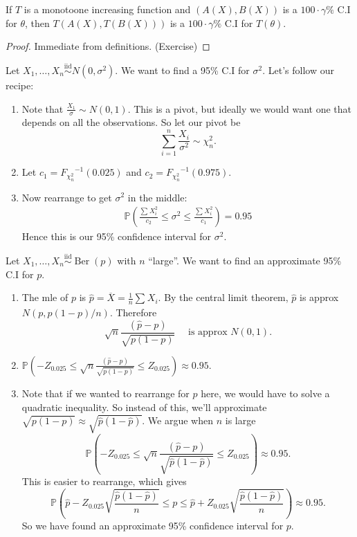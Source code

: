 \documentclass[a4paper]{scrartcl}
\begin{document}
\begin{proposition}
      If $T$ is a monotoone increasing function and $(A (X),B (X))$ is a $100 \cdot \gamma \%$ C.I for $\theta$, then $T (A (X),T (B (X)))$ is a $100 \cdot \gamma \%$ C.I for $T (\theta)$.
\end{proposition}
\begin{proof}
      Immediate from definitions. (Exercise)
\end{proof}
\begin{example*}
      Let $X_1 , \ldots, X_n \overset{\operatorname{iid}}{\sim} N (0,\sigma^{2} )$. We want to find a 95\% C.I for $\sigma^2$. Let's follow our recipe:
      \begin{enumerate}
           \item Note that $ \frac{X_1 }{\sigma}\sim N (0,1)$. This is a pivot, but ideally we would want one that depends on all the observations. So let our pivot be \[
               \sum_{i=1}^{n} \frac{X_{i}}{\sigma^2} \sim \chi_{n}^2
           .\] 
           \item Let $c_1 = {F_{\chi_{n}^2}}^{-1} (0.025) $ and $c_2 ={F_{\chi_{n}^2}}^{-1}(0.975)$.
           \item Now rearrange to get $\sigma^{2}$ in the middle: 
           \begin{align*}
                \mathbb{P}( \frac{\sum_{}^{}X_i^2}{c_2 }\leq \sigma^2 \leq \frac{\sum_{}^{}X_i^2}{c_1 })=0.95
           \end{align*}
           Hence this is our 95\% confidence interval for $\sigma^{2}$.
      \end{enumerate}
\end{example*}
\begin{example*}
      Let $X_1 , \ldots, X_n \overset{\operatorname{iid}}{\sim} \operatorname{Ber} (p)$ with $n$ ``large''. We want to find an approximate 95\% C.I for $p$.
     \begin{enumerate}
          \item The mle of $p$ is $\hat{p}=\overline{X}=\frac{1}{n}\sum_{}^{}X_{i}$. By the central limit theorem, $\hat{p}$ is approx $N (p,p (1-p)/n)$. Therefore \[
          \sqrt{n} \frac{(\hat{p}-p)}{\sqrt{p (1-p)}} \quad \text{ is approx } N (0,1)
          .\] 
          \item $\mathbb{P} (-Z_{0.025} \leq \sqrt{n}\frac{(\hat{p}-p)}{\sqrt{p (1-p)}} \leq Z_{0.025})\approx 0.95$.
          \item Note that if we wanted to rearrange for $p$ here, we would have to solve a quadratic inequality. So instead of this, we'll approximate $\sqrt{p (1-p)} \approx \sqrt{\hat{p} (1-\hat{p})}$. We argue when $n$ is large \[
               \mathbb{P} (-Z_{0.025} \leq \sqrt{n}\frac{(\hat{p}-p)}{\sqrt{\hat{p} (1-\hat{p})}} \leq Z_{0.025})\approx 0.95
          .\] This is easier to rearrange, which gives \[
          \mathbb{P} (\hat{p}-Z_{0.025} \sqrt{ \frac{\hat{p} (1-\hat{p})}{n}}\leq p \leq \hat{p}+Z_{0.025} \sqrt{ \frac{\hat{p} (1-\hat{p})}{n}})\approx 0.95
          .\] So we have found an approximate 95\% confidence interval for $p$.
     \end{enumerate}
\end{example*}
\end{document}
